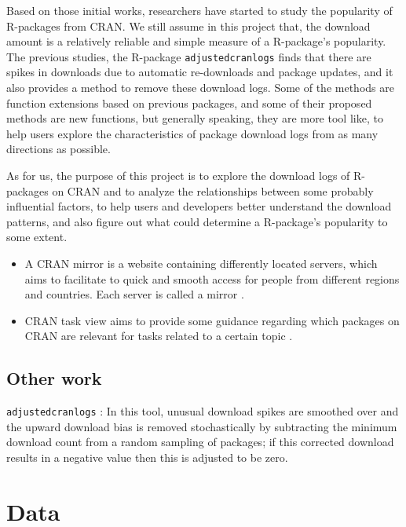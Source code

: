 \documentclass[
]{book}
\begin{document}
Based on those initial works, researchers have started to study the popularity of R-packages from CRAN. We still assume in this project that, the download amount is a relatively reliable and simple measure of a R-package's popularity. The previous studies, the R-package \texttt{adjustedcranlogs}\citep{adjustedcranlogs} finds that there are spikes in downloads due to automatic re-downloads and package updates, and it also provides a method to remove these download logs. Some of the methods are function extensions based on previous packages, and some of their proposed methods are new functions, but generally speaking, they are more tool like, to help users explore the characteristics of package download logs from as many directions as possible.

As for us, the purpose of this project is to explore the download logs of R-packages on CRAN and to analyze the relationships between some probably influential factors, to help users and developers better understand the download patterns, and also figure out what could determine a R-package's popularity to some extent.

\begin{itemize}
\item
  A CRAN mirror is a website containing differently located servers, which aims to facilitate to quick and smooth access for people from different regions and countries. Each server is called a mirror \citep{cranmirror}.
\item
  CRAN task view aims to provide some guidance regarding which packages on CRAN are relevant for tasks related to a certain topic \citep{crantaskviews}.
\end{itemize}

\hypertarget{other-work}{%
\section{Other work}\label{other-work}}

\texttt{adjustedcranlogs}\citep{adjustedcranlogs} : In this tool, unusual download spikes are smoothed over and the upward download bias is removed stochastically by subtracting the minimum download count from a random sampling of packages; if this corrected download results in a negative value then this is adjusted to be zero.

\hypertarget{data}{%
\chapter{Data}\label{data}}
\end{document}
